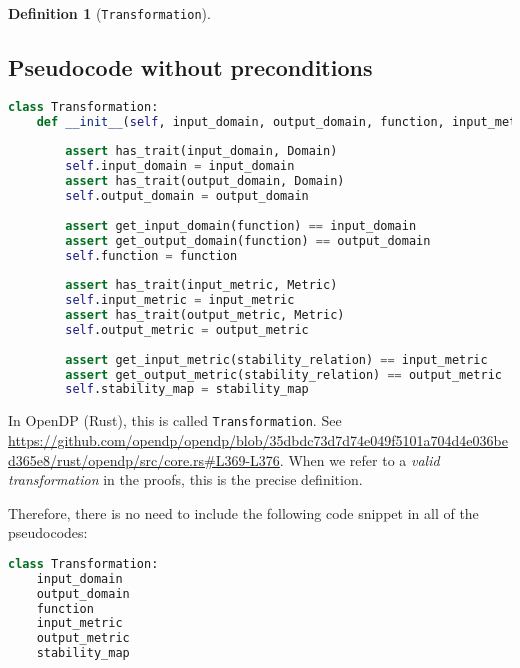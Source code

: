 \documentclass[11pt,a4paper]{article}
\theoremstyle{definition}
\newtheorem{definition}[theorem]{Definition}
\newcommand{\inOpenDPRust}[2]{In OpenDP (Rust), this is called \texttt{#1}. See \url{#2}.}
\begin{document}
\begin{definition}[\texttt{Transformation}]
\subsection{Pseudocode without preconditions}
\label{sec:pseudocode-wout-preconditions}
\begin{lstlisting}[language=Python]
class Transformation:
    def __init__(self, input_domain, output_domain, function, input_metric, output_metric, stability_map):
        
        assert has_trait(input_domain, Domain)
        self.input_domain = input_domain
        assert has_trait(output_domain, Domain)
        self.output_domain = output_domain
        
        assert get_input_domain(function) == input_domain
        assert get_output_domain(function) == output_domain
        self.function = function
        
        assert has_trait(input_metric, Metric)
        self.input_metric = input_metric
        assert has_trait(output_metric, Metric)
        self.output_metric = output_metric
        
        assert get_input_metric(stability_relation) == input_metric
        assert get_output_metric(stability_relation) == output_metric
        self.stability_map = stability_map
\end{lstlisting}
    
    \inOpenDPRust{Transformation}{https://github.com/opendp/opendp/blob/35dbdc73d7d74e049f5101a704d4e036bed365e8/rust/opendp/src/core.rs\#L369-L376} When we refer to a \textit{valid transformation} in the proofs, this is the precise definition.
\end{definition}
Therefore, there is no need to include the following code snippet in all of the pseudocodes:
\begin{lstlisting}[language=Python]
class Transformation:
    input_domain
    output_domain
    function
    input_metric
    output_metric
    stability_map
\end{lstlisting}
\end{document}
